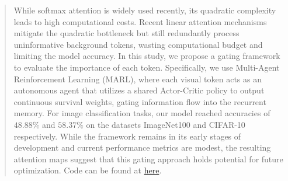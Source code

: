 \begin{abstract}

	While softmax attention is widely used recently, its quadratic complexity leads
	to high computational costs. Recent linear attention mechanisms mitigate the quadratic bottleneck but still redundantly process uninformative background tokens, wasting computational budget and limiting the model accuracy. In this study, we propose a gating framework to evaluate the importance of each token. Specifically, we use Multi-Agent Reinforcement Learning (MARL), where each visual token acts as an autonomous agent that utilizes a shared Actor-Critic policy to output continuous survival weights, gating information flow into the recurrent memory. For image classification tasks, our model reached accuracies of \(48.88 \% \) and \(58.37 \% \) on the datasets ImageNet100 and CIFAR-10 respectively. While the framework remains in its early stages of development and current performance metrics are modest, the resulting attention maps suggest that this gating approach holds potential for future optimization. Code can be found at \href{https://github.com/pnmq1103/wr227}{here}.
\end{abstract}
